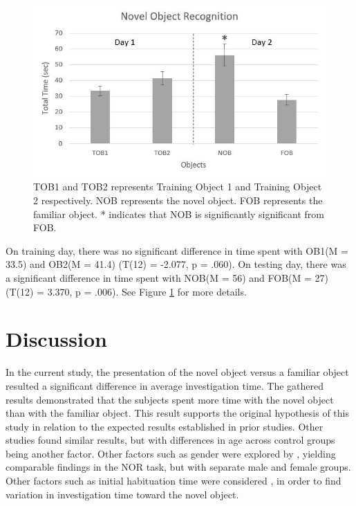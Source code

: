 \documentclass[a4paper, 12pt]{article}
\begin{document}
\begin{figure}[h!]
    \centering{}
    \includegraphics{norChart.JPG}
    \caption{TOB1 and TOB2 represents Training Object 1 and Training Object 2 respectively. NOB represents the novel object. FOB represents the familiar object. * indicates that NOB is significantly significant from FOB.}
    \label{fig:norChart}
\end{figure}

On training day, there was no significant difference in time spent with OB1(M = 33.5) and OB2(M = 41.4) (T(12) = -2.077, p = .060). On testing day, there was a significant difference in time spent with NOB(M = 56) and FOB(M = 27) (T(12) = 3.370, p = .006). See Figure \ref{fig:norChart} for more details.

\section{Discussion}
In the current study, the presentation of the novel object versus a familiar object resulted a significant difference in average investigation time. The gathered results demonstrated that the subjects spent more time with the novel object than with the familiar object. This result supports the original hypothesis of this study in relation to the expected results established in prior studies. Other studies \cite{reger2009ontogeny, anderson2004effects} found similar results, but with differences in age across control groups being another factor. Other factors such as gender were explored by \cite{sutcliffe2007influence}, yielding comparable findings in the NOR task, but with separate male and female groups. Other factors such as initial habituation time were considered \cite{leger2013object}, in order to find variation in investigation time toward the novel object.
\end{document}
